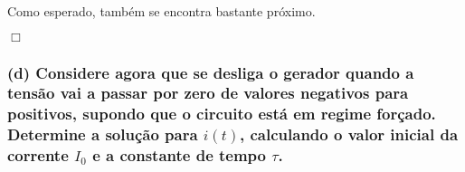 Como esperado, também se encontra bastante próximo.

\hfill \ensuremath{\Box}

\vspace{0.75cm}

\iffalse
\begin{figure}[!h]  
    \centering
        \begin{tikzpicture}
            \begin{axis}[
                axis lines = left,
                xlabel = {Tempo $t$ ($\mu$s)},
                ylabel = {Corrente $i(t)$ (mA)},
                grid style=dashed,
                grid=both,
                minor tick num=4
            ]

            \addplot[
                domain=90:100, 
                samples=100, 
                color=black
            ]
            {0.896*cos(deg(1.8*x-180)) + 0.893*e^(-0.003*x)};
            
            
            
            
            
            \end{axis}
        \end{tikzpicture}
\caption{Proximidade entre os valores aproximados e os valores obtidos através do processo \textit{iterativo}.} \label{fig:proximidade} 
\end{figure}
\fi
\clearpage
\subsubsection*{(d) Considere agora que se desliga o gerador quando a tensão vai a passar por zero de valores negativos para positivos, supondo que o circuito está em regime forçado. Determine a solução para $i(t)$, calculando o valor inicial da corrente $I_0$ e a constante de tempo $\tau$.}
\label{subsubsec_d}
